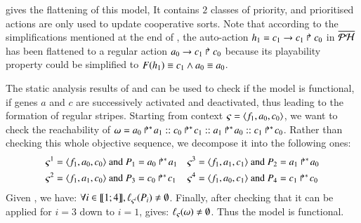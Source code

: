  gives the flattening of this model,
%
It contains $2$ classes of priority, and prioritised actions are only used to update cooperative sorts.
Note that according to the simplifications mentioned at the end of ,
the auto-action $h_1 = c_1\rightarrow c_1\Rsh c_0$ in $\overline{\mathcal{PH}}$ has been flattened to a regular action $a_0\rightarrow c_1\Rsh c_0$
because its playability property could be simplified to $F(h_1) \equiv c_1 \wedge a_0 \equiv a_0$.

The static analysis results of  and  can be used to check if the model is functional, \ie
if genes $a$ and $c$ are successively activated and deactivated,
thus leading to the formation of regular stripes.
Starting from context $\varsigma = \mbox{$\langle f_1, a_0, c_0 \rangle$}$,
we want to check the reachability of
$\omega = \mbox{$a_0\Rsh^*\!a_1$} :: \mbox{$c_0\Rsh^*\!c_1$} :: \mbox{$a_1\Rsh^*\!a_0$} :: \mbox{$c_1\Rsh^*\!c_0$}$.
Rather than checking this whole objective sequence,
we decompose it into the following ones:
\begin{align*}
  \varsigma^1 &= \mbox{$\langle f_1, a_0, c_0 \rangle$} \text{ and } P_1 = \mbox{$a_0\Rsh^*\!a_1$} &
  \varsigma^3 &= \mbox{$\langle f_1, a_1, c_1 \rangle$} \text{ and } P_2 = \mbox{$a_1\Rsh^*\!a_0$} \\
  \varsigma^2 &= \mbox{$\langle f_1, a_1, c_0 \rangle$} \text{ and } P_3 = \mbox{$c_0\Rsh^*\!c_1$} &
  \varsigma^4 &= \mbox{$\langle f_1, a_0, c_1 \rangle$} \text{ and } P_4 = \mbox{$c_1\Rsh^*\!c_0$}
\end{align*}
Given , we have: $\forall i \in \llbracket 1; 4 \rrbracket, \ell_{\varsigma^i}(P_i) \neq \emptyset$.
Finally, after checking that it can be applied for $i = 3$ down to $i = 1$,
 gives: $\ell_\varsigma(\omega) \neq \emptyset$.
Thus the model is functional.



